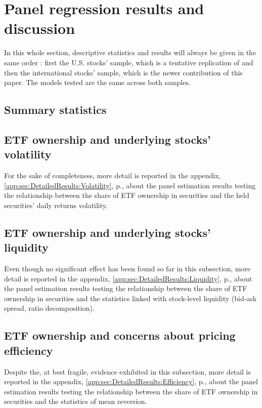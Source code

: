 
\section{Panel regression results and discussion}
\label{sec:Results}
In this whole section, descriptive statistics and results will always be given in the same order : first the U.S. stocks' sample, which is a tentative replication of \textcite{Ben-David2018} and then the international stocks' sample, which is the newer contribution of this paper. The models tested are the same across both samples.
\subsection{Summary statistics}

\subsection{ETF ownership and underlying stocks' volatility}
\label{sec:Results:sub:Volatility}

For the sake of completeness, more detail is reported in the appendix, \autoref{app:sec:DetailedResults:Volatility}, p.\pageref{app:sec:DetailedResults:Volatility},  about the panel estimation results testing the relationship between the share of ETF ownership in securities and the held securities' daily returns volatility. 

\subsection{ETF ownership and underlying stocks' liquidity}
\label{sec:Results:sub:Liquidity}

Even though no significant effect has been found so far in this subsection, more detail is reported in the appendix, \autoref{app:sec:DetailedResults:Liquidity}, p.\pageref{app:sec:DetailedResults:Liquidity},  about the panel estimation results testing the relationship between the share of ETF ownership in securities and the statistics linked with stock-level liquidity (bid-ask spread, \textcite{Amihud2002} ratio decomposition).
\subsection{ETF ownership and concerns about pricing efficiency}
\label{sec:Results:sub:Efficiency}

\begin{landscape}
{\linespread{1.0}
\begin{table}[htbp]
  
\end{table}
}
\end{landscape}

Despite the, at best fragile, evidence exhibited in this subsection, more detail is reported in the appendix, \autoref{app:sec:DetailedResults:Efficiency}, p.\pageref{app:sec:DetailedResults:Efficiency}, about the panel estimation results testing the relationship between the share of ETF ownership in securities and the statistics of mean reversion.
